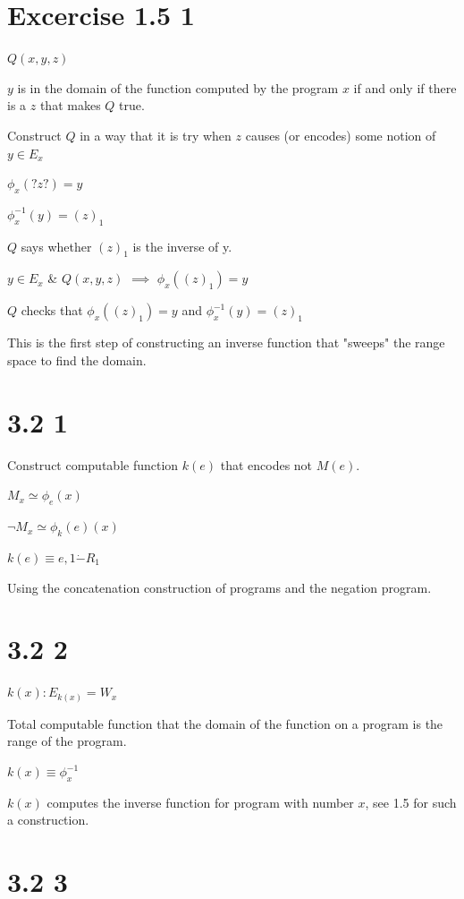 \documentclass[fleqn]{article}
\begin{document}
\section*{Excercise 1.5 1}

$Q(x, y, z)$

$y$ is in the domain of the function computed by the program $x$ if and only if there is a $z$ that makes $Q$ true.

Construct $Q$ in a way that it is try when $z$ causes (or encodes) some notion of $y \in E_x$

$\phi_x(?z?) = {y}$

$\phi_x^{-1}(y) = (z)_1$

$Q$ says whether $(z)_1$ is the inverse of y.

$y \in E_x$ \& $Q(x, y, z)$ $\implies$ $\phi_x((z)_1) = y$

$Q$ checks that $\phi_x((z)_1) = y$ and $\phi_x^{-1}(y) = (z)_1$

\bigskip

This is the first step of constructing an inverse function that "sweeps" the range space to find the domain.

\section*{3.2 1}

Construct computable function $k(e)$ that encodes not $M(e)$.

$M_x\simeq\phi_e(x)$

$\neg M_x \simeq \phi_k(e)(x)$

$k(e) \equiv e, 1 \dot{-} R_1$

\bigskip

Using the concatenation construction of programs and the negation program.

\section*{3.2 2}

$k(x): E_{k(x)} = W_x$

Total computable function that the domain of the function on a program is the range of the program.

$k(x) \equiv \phi_x^{-1}$

\bigskip

$k(x)$ computes the inverse function for program with number $x$, see 1.5 for such a construction.

\section*{3.2 3}
\end{document}
